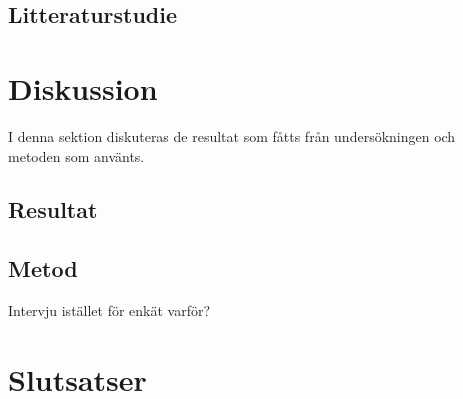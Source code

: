 \subsection{Litteraturstudie}
\cite{henrik_maintainability}
\cite{henrik_totypeornot}

\section{Diskussion}
I denna sektion diskuteras de resultat som fåtts från undersökningen och metoden som använts.
\subsection{Resultat}
\subsection{Metod}
Intervju istället för enkät varför?
\section{Slutsatser}



